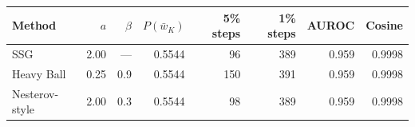 \begin{tabular}{lrrrrrrr}
\toprule
Method & $a$ & $\beta$ & $P(\bar w_K)$ & 5\% steps & 1\% steps & AUROC & Cosine \\
\midrule
SSG & 2.00 & --- & 0.5544 & 96 & 389 & 0.959 & 0.9998 \\
Heavy Ball & 0.25 & 0.9 & 0.5544 & 150 & 391 & 0.959 & 0.9998 \\
Nesterov-style & 2.00 & 0.3 & 0.5544 & 98 & 389 & 0.959 & 0.9998 \\
\bottomrule
\end{tabular}
